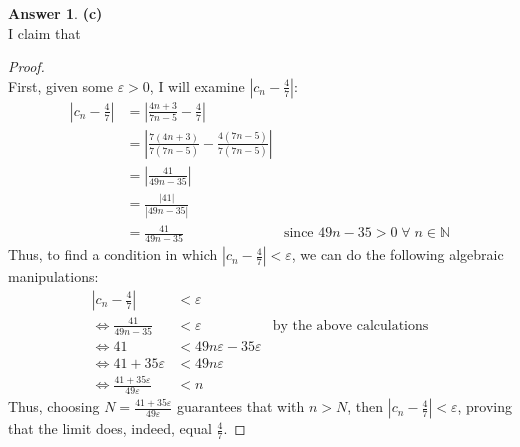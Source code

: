 \documentclass[10pt,a4paper]{article}
\theoremstyle{definition}
\newtheorem*{answer*}{Answer}
\begin{document}
\begin{answer*}{\textbf{(c)}}
\\I claim that 
\begin{proof}{$ $}
\\First, given some $\varepsilon > 0$, I will examine $\displaystyle \left|c_n - \frac{4}{7}\right|$:
\begin{align*}
\left|c_n - \frac{4}{7}\right| &= \left|\frac{4n + 3}{7n - 5} - \frac{4}{7}\right|\\
&= \left|\frac{7(4n + 3)}{7(7n - 5)} - \frac{4(7n - 5)}{7(7n - 5)}\right|\\
&= \left|\frac{41}{49n - 35}\right|\\
&= \frac{|41|}{|49n - 35|}\\
&= \frac{41}{49n - 35} &\text{since } 49n - 35 > 0 \; \forall \; n \in \mathbb{N}
\end{align*}
Thus, to find a condition in which $\displaystyle \left|c_n - \frac{4}{7}\right| < \varepsilon$, we can do the following algebraic manipulations:
\begin{align*}
\left|c_n - \frac{4}{7}\right| &< \varepsilon\\
\iff \frac{41}{49n - 35} &< \varepsilon &\text{by the above calculations}\\
\iff 41 &< 49n\varepsilon - 35\varepsilon\\
\iff 41 + 35\varepsilon &< 49n\varepsilon\\
\iff \frac{41 + 35\varepsilon}{49\varepsilon} &< n
\end{align*}
Thus, choosing $\displaystyle N = \frac{41 + 35\varepsilon}{49\varepsilon}$ guarantees that with $n > N$, then $\displaystyle \left|c_n - \frac{4}{7}\right| < \varepsilon$, proving that the limit does, indeed, equal $\displaystyle \frac{4}{7}$.
\end{proof}
\end{answer*}
\end{document}
